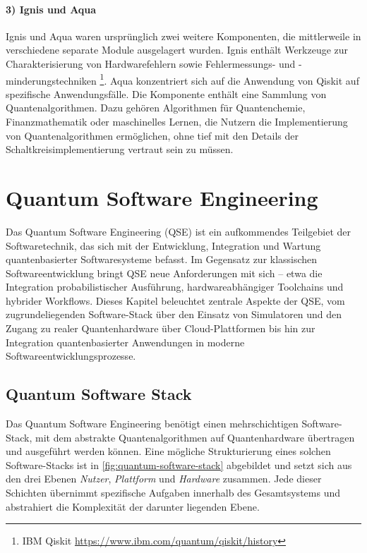 \paragraph{3) Ignis und Aqua}
Ignis und Aqua waren ursprünglich zwei weitere Komponenten, die mittlerweile in verschiedene separate Module ausgelagert wurden. Ignis enthält Werkzeuge zur Charakterisierung von Hardwarefehlern sowie Fehlermessungs- und -minderungstechniken \footnote{IBM Qiskit \url{https://www.ibm.com/quantum/qiskit/history}}. Aqua konzentriert sich auf die Anwendung von Qiskit auf spezifische Anwendungsfälle. Die Komponente enthält eine Sammlung von Quantenalgorithmen. Dazu gehören Algorithmen für Quantenchemie, Finanzmathematik oder maschinelles Lernen, die Nutzern die Implementierung von Quantenalgorithmen ermöglichen, ohne tief mit den Details der Schaltkreisimplementierung vertraut sein zu müssen. \autocite{javadi-abhariQuantumComputingQiskit2024a}

\section{Quantum Software Engineering}

Das Quantum Software Engineering (QSE) ist ein aufkommendes Teilgebiet der Softwaretechnik, das sich mit der Entwicklung, Integration und Wartung quantenbasierter Softwaresysteme befasst. Im Gegensatz zur klassischen Softwareentwicklung bringt QSE neue Anforderungen mit sich – etwa die Integration probabilistischer Ausführung, hardwareabhängiger Toolchains und hybrider Workflows. \autocite{zhao_quantum-based_2025} Dieses Kapitel beleuchtet zentrale Aspekte der QSE, vom zugrundeliegenden Software-Stack über den Einsatz von Simulatoren und den Zugang zu realer Quantenhardware über Cloud-Plattformen bis hin zur Integration quantenbasierter Anwendungen in moderne Softwareentwicklungsprozesse.

\subsection{Quantum Software Stack}
\label{sec:quantum-software-stack}

Das Quantum Software Engineering benötigt einen mehrschichtigen Software-Stack, mit dem abstrakte Quantenalgorithmen auf Quantenhardware übertragen und ausgeführt werden können. Eine mögliche Strukturierung eines solchen Software-Stacks ist in \autoref{fig:quantum-software-stack} abgebildet und setzt sich aus den drei Ebenen \textit{Nutzer}, \textit{Plattform} und \textit{Hardware} zusammen. Jede dieser Schichten übernimmt spezifische Aufgaben innerhalb des Gesamtsystems und abstrahiert die Komplexität der darunter liegenden Ebene.
\\

